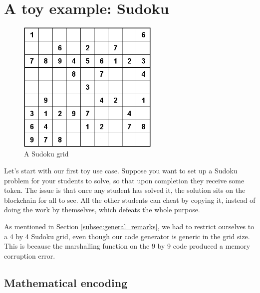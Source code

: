 \documentclass[10pt,a4paper]{article}
\begin{document}
\section{A toy example: Sudoku}
\label{section_sudoku}

	\begin{figure}[!h]
	\centering
	\includegraphics[width=0.6\textwidth]{Sudoku04}
	\caption{A Sudoku grid}
	\end{figure}


Let's start with our first toy use case. Suppose you want to set up a Sudoku problem for your students to solve, so that upon completion they receive some token. The issue is that once any student has solved it, the solution sits on the blockchain for all to see. All the other students can cheat by copying it, instead of doing the work by themselves, which defeats the whole purpose.

As mentioned in Section \ref{subsec:general_remarks}, we had to restrict ourselves to a 4 by 4 Sudoku grid, even though our code generator is generic in the grid size. This is because the marshalling function on the 9 by 9 code produced a memory corruption error.

\subsection{Mathematical encoding}
\label{subsec:math_enc}
\end{document}
